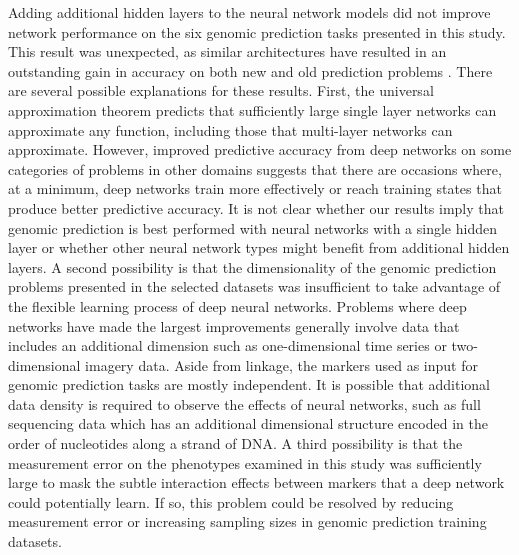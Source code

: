 Adding additional hidden layers to the neural network models did not improve
network performance on the six genomic prediction tasks presented in this study.
This result was unexpected, as similar architectures have resulted in an outstanding 
gain in accuracy on both new and old prediction problems \citep{subasi2005, lang1990, mnih2013}.
There are several possible explanations for these results. First, the universal
approximation theorem predicts that sufficiently large single layer networks
can approximate any function, including those that multi-layer networks can approximate.
However, improved predictive accuracy from deep networks on some categories of problems
in other domains suggests that there are occasions where, 
at a minimum, deep networks train more effectively or reach training states that 
produce better predictive accuracy. It is not clear whether our results imply that
genomic prediction is best performed with neural networks with a single hidden 
layer or whether other neural network types might benefit from additional hidden layers.
A second possibility is that the dimensionality of the genomic prediction problems
presented in the selected datasets was insufficient to take advantage of the
flexible learning process of deep neural networks. Problems where deep networks have
made the largest improvements generally involve data that includes an additional dimension
such as one-dimensional time series or two-dimensional imagery data. Aside from linkage, the markers used as 
input for genomic prediction tasks are mostly independent. It is possible that 
additional data density is required to observe the effects of neural networks, 
such as full sequencing data which has an additional dimensional structure encoded 
in the order of nucleotides along a strand of DNA. A third possibility is that 
the measurement error on the phenotypes examined in this study was sufficiently 
large to mask the subtle interaction effects between markers that a deep 
network could potentially learn. If so, this problem could be resolved by reducing 
measurement error or increasing sampling sizes in genomic prediction training datasets.  

